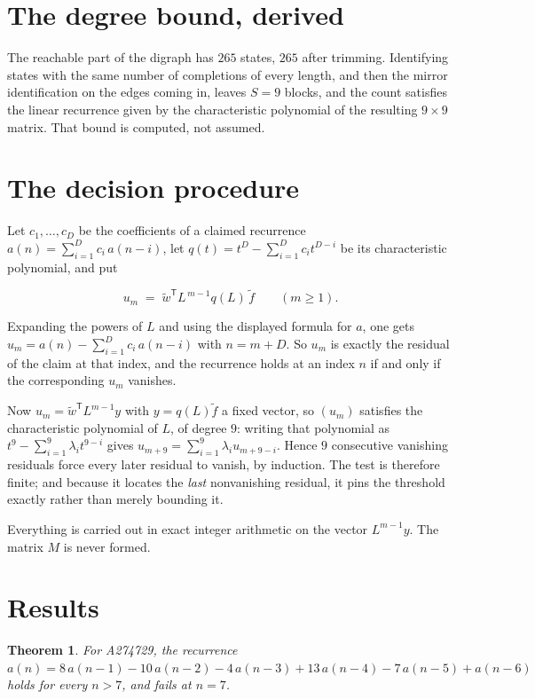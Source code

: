 \documentclass[11pt]{article}
\newtheorem{theorem}{Theorem}
\theoremstyle{definition}
\begin{document}
\section{The degree bound, derived}

The reachable part of the digraph has $265$ states, $265$ after trimming. Identifying states with the same number of completions of every length, and then the mirror identification on the edges coming in, leaves $S = 9$ blocks, and the count satisfies the linear recurrence given by the characteristic polynomial of the resulting $9\times9$ matrix. That bound is computed, not assumed.

\section{The decision procedure}

Let $c_1,\dots,c_D$ be the coefficients of a claimed recurrence $a(n) = \sum_{i=1}^{D} c_i\,a(n-i)$, let $q(t) = t^{D} - \sum_{i=1}^{D} c_i t^{D-i}$ be its characteristic polynomial, and put

\[u_m \;=\; \tilde w^{\mathsf T} L^{\,m-1} q(L)\,\tilde f \qquad (m \ge 1).\]

Expanding the powers of $L$ and using the displayed formula for $a$, one gets $u_m = a(n) - \sum_{i=1}^{D} c_i\,a(n-i)$ with $n = m + D$. So $u_m$ is exactly the residual of the claim at that index, and the recurrence holds at an index $n$ if and only if the corresponding $u_m$ vanishes.

Now $u_m = \tilde w^{\mathsf T} L^{m-1} y$ with $y = q(L)\tilde f$ a fixed vector, so $(u_m)$ satisfies the characteristic polynomial of $L$, of degree $9$: writing that polynomial as $t^{9} - \sum_{i=1}^{9} \lambda_i t^{9-i}$ gives $u_{m+9} = \sum_{i=1}^{9} \lambda_i u_{m+9-i}$. Hence $9$ consecutive vanishing residuals force every later residual to vanish, by induction. The test is therefore finite; and because it locates the {\itshape last} nonvanishing residual, it pins the threshold exactly rather than merely bounding it.

Everything is carried out in exact integer arithmetic on the vector $L^{m-1}y$. The matrix $M$ is never formed.

\section{Results}

\begin{theorem} For A274729, the recurrence $a(n) = 8\,a(n-1) - 10\,a(n-2) - 4\,a(n-3) + 13\,a(n-4) - 7\,a(n-5) + a(n-6)$ holds for every $n > 7$, and fails at $n = 7$.\end{theorem}
\end{document}
